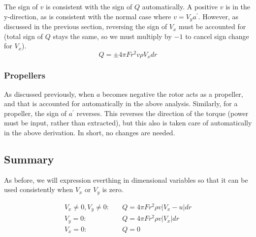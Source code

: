 \documentclass{article}
\begin{document}
The sign of $v$ is consistent with the sign of $Q$ automatically.  A positive $v$ is in the y-direction, as is consistent with the normal case where $v = V_y a^\prime$.  However, as discussed in the previous section, reversing the sign of $V_x$ must be accounted for (total sign of $Q$ stays the same, so we must multiply by $-1$ to cancel sign change for $V_x$).
\begin{equation}
    Q = \pm 4 \pi F r^2 v \rho V_x dr
\end{equation}



\subsubsection{Propellers}

As discussed previously, when $a$ becomes negative the rotor acts as a propeller, and that is accounted for automatically in the above analysis.  Similarly, for a propeller, the sign of $a^\prime$ reverses.  This reverses the direction of the torque (power must be input, rather than extracted), but this also is taken care of automatically in the above derivation.  In short, no changes are needed.

\subsection{Summary}

As before, we will expression everthing in dimensional variables so that it can be used consistently when $V_x$ or $V_y$ is zero.



\begin{equation}
\begin{aligned}
    V_x \ne 0, V_y \ne 0:&\quad
    Q = 4 \pi F r^2 \rho v |V_x - u| dr \\
    V_y = 0:&\quad
    Q = 4 \pi F r^2 \rho v  |V_x| dr \\
    V_x = 0:&\quad Q = 0\\
\end{aligned}
\label{eq:CQmom}
\end{equation}
\end{document}
